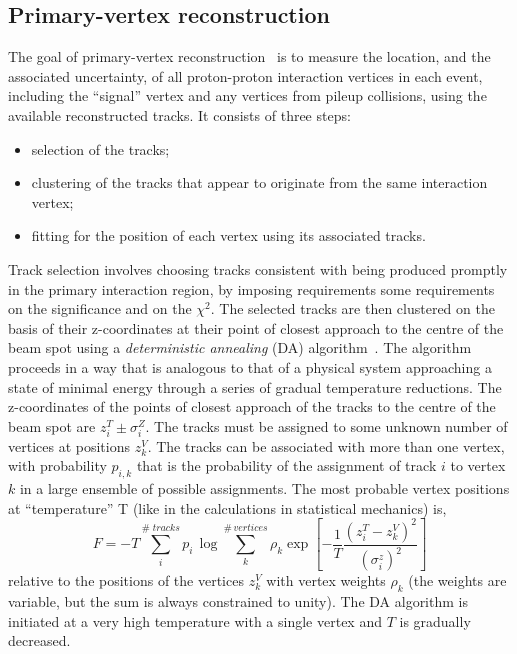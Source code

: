 \subsection*{Primary-vertex reconstruction}
The goal of primary-vertex reconstruction~\cite{Speer:927395}  is to measure the location, and the associated
uncertainty, of all proton-proton interaction vertices in each event, including the ``signal'' vertex
and any vertices from pileup collisions, using the available reconstructed tracks.  
It consists of three steps: 
\begin{itemize} 
\item  selection of the tracks;
\item clustering of the tracks that appear to originate from the same interaction vertex;
\item fitting for the position of each vertex using its associated tracks.
\end{itemize}
Track selection involves choosing tracks consistent with being produced promptly in the primary interaction region, 
by imposing requirements some requirements~\cite{Chatrchyan:2014fea} on the significance and on the $\chi^2$.
The selected tracks are then clustered on the basis of their z-coordinates at their point of closest approach to the centre of the beam spot  using a
\textit{deterministic annealing} (DA) algorithm~\cite{726788}. 
The algorithm proceeds in a way that is analogous to that of a physical system approaching a state of minimal energy through a series of
gradual  temperature  reductions. 
The z-coordinates  of  the  points  of  closest  approach  of  the tracks to the centre of the beam spot are $z_i^T \pm \sigma_i^Z$.
 The tracks must be assigned to some unknown number of vertices at positions $z_k^V$.
The tracks can be associated with more than one vertex, with probability $p_{i,k}$ that is  the probability of the
assignment of track $i$ to vertex $k$ in a large ensemble of possible assignments.
 The most probable vertex positions at ``temperature'' T (like in the calculations in statistical mechanics) is,
\begin{equation}
F=-T \sum_{i}^{\# \; tracks} p_i \, \log \sum_{k}^{\# \, vertices} \rho_k  \exp [-\frac{1}{T} \frac{(z_i^T-z_k^V)^2}{(\sigma_i^z)^2}  ]
\end{equation}
 relative to the positions of the vertices $z_k^V$ with vertex weights $\rho_k$ (the weights are variable, but the sum is always constrained
to unity).
The DA algorithm is initiated at a very high temperature with a single vertex and $T$ is gradually decreased.
